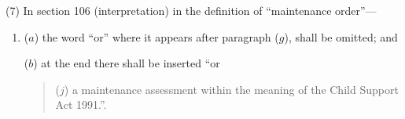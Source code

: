 \documentclass[12pt,a4paper]{article}
\begin{document}
(7) In section 106 (interpretation) in the definition of “maintenance order”—
\begin{enumerate}\item[]
($a$) the word “or” where it appears after paragraph ($g$), shall be omitted; and

($b$) at the end there shall be inserted “or
\begin{quotation}
($j$) a maintenance assessment within the meaning of the Child Support Act 1991.”.
\end{quotation}
\end{enumerate}
\end{document}
